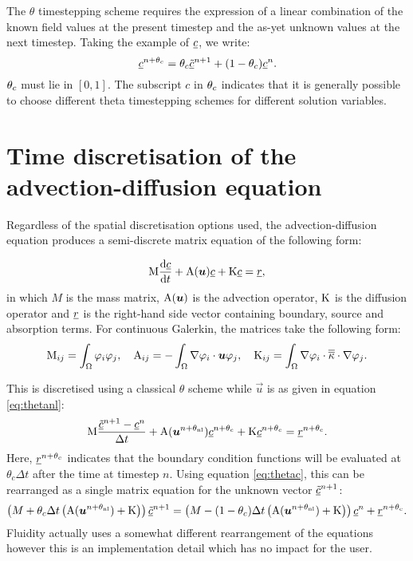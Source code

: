 The $\theta$ timestepping scheme requires the expression of a linear
combination of the known field values at the present timestep and the as-yet
unknown values at the next timestep. Taking the example of $\underline{c}$, we write:
\begin{equation}
  \label{eq:thetac}
  \underline{c}^{n+\theta_c}=\theta_c\underline{\tilde c}^{n+1}+(1-\theta_c)\underline{c}^{n}.
\end{equation}
$\theta_c$ must lie in $[0,1]$. The subscript $c$ in $\theta_c$ indicates that it is 
generally possible to choose different theta timestepping schemes for different solution
variables.

\section{Time discretisation of the advection-diffusion equation}
\label{sec:ND_time_disct_adv_diff}

Regardless of the spatial discretisation options used, the
advection-diffusion equation produces a semi-discrete matrix equation of the
following form:

\begin{equation}
  \mathrm{M} \frac{\mathrm{d}\underline{c}}{\mathrm{d} t}+\mathrm{A}({\mbox{\boldmath$u$}})\underline{c}+\mathrm{K}\underline{c}=\underline{r},
\end{equation}
in which $M$ is the mass matrix, $\mathrm{A}({\mbox{\boldmath$u$}})$ is the advection
operator, $\mathrm{K}$ is the diffusion operator and $\underline{r}$ is the
right-hand side vector containing boundary, source and absorption terms. For continuous
Galerkin, the matrices take the following form:
\begin{equation}
  \mathrm{M}_{ij}=\int_\Omega \varphi_i\varphi_j, \quad
  \mathrm{A}_{ij}=-\int_\Omega \nabla\varphi_i\cdot{\mbox{\boldmath$u$}} \varphi_j, \quad
  \mathrm{K}_{ij}=\int_\Omega \nabla\varphi_i\cdot \overline{\overline{\kappa}}\cdot\nabla \varphi_j.
\end{equation}

This is discretised using a classical $\theta$ scheme while $\vec u$ is as
given in equation \eqref{eq:thetanl}:
\begin{equation}
  \mathrm{M} \frac{\underline{\tilde c}^{n+1}-\underline{c}^{n}}{\Delta t}
  +\mathrm{A}({\mbox{\boldmath$u$}}^{n+\theta_{\mathrm{nl}}})\underline{c}^{n+\theta_c}+\mathrm{K}\underline{c}^{n+\theta_c}=\underline{r}^{n+\theta_c}.
\end{equation}
Here, $\underline{r}^{n+\theta_c}$ indicates that the boundary condition
functions will be evaluated at $\theta_c\Delta t$ after the time at timestep
$n$. Using equation \eqref{eq:thetac}, this can be rearranged as a single
matrix equation for the unknown vector $\underline{\tilde c}^{n+1}$:
\begin{equation}
  \left(M+\theta_c\Delta t\left(\mathrm{A}({\mbox{\boldmath$u$}}^{n+\theta_{\mathrm{nl}}})+\mathrm{K}\right)\right)\underline{\tilde c}^{n+1}
  =\left(M-(1-\theta_c)\Delta
    t\left(\mathrm{A}({\mbox{\boldmath$u$}}^{n+\theta_{\mathrm{nl}}})+\mathrm{K}\right)\right)\underline{c}^{n} +\underline{r}^{n+\theta_c}.
\end{equation}
Fluidity actually uses a somewhat different rearrangement of the equations
however this is an implementation detail which has no impact for the user.

